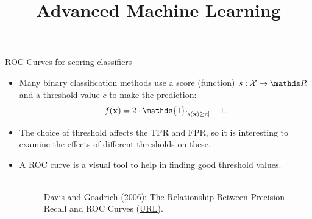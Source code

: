 \documentclass[11pt,compress,t,notes=noshow, xcolor=table]{beamer}
\title{Advanced Machine Learning}
\date{}
\begin{document}
	
	
	
	
	\sloppy
	
	
	
	\begin{frame}{ROC Curves for scoring classifiers}
		\small
		\begin{itemize}
			\item 	Many binary classification methods use a score (function) $s:\Xspace \to \R$ and a threshold value $c$ to make the prediction:
			$$\fx = 2 \cdot \mathds{1}_{[ s(\xv) \ge c]} -1.$$
			\item The choice of threshold affects the TPR and FPR, so it is interesting to examine the effects of different thresholds on these.
			
			\item A ROC curve is a visual tool to help in finding good threshold values.
%			
			
			\begin{figure}
				\centering
				\tiny
				\\Davis and Goadrich (2006): The Relationship Between Precision-Recall and
				ROC Curves (\href{https://www.biostat.wisc.edu/~page/rocpr.pdf}
				{\underline{URL}}).
			\end{figure}
		\end{itemize}

	\end{frame}
\end{document}

